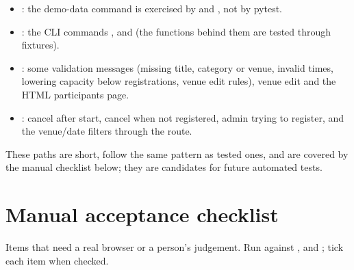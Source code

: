 \documentclass[11pt,a4paper]{article}
\begin{document}
\begin{itemize}
  \item {}: the demo-data command is exercised by  and ,
        not by pytest.
  \item {}: the CLI commands ,  and 
        (the functions behind them are tested through fixtures).
  \item {}: some validation messages (missing title, category or venue, invalid times,
        lowering capacity below registrations, venue edit rules), venue edit and the HTML participants
        page.
  \item {}: cancel after start, cancel when not registered, admin trying to register,
        and the venue/date filters through the route.
\end{itemize}

These paths are short, follow the same pattern as tested ones, and are covered by the manual
checklist below; they are candidates for future automated tests.

\section{Manual acceptance checklist}
\label{sec:manual}

Items that need a real browser or a person's judgement. Run against ,
 and ; tick each item when checked.
\end{document}
